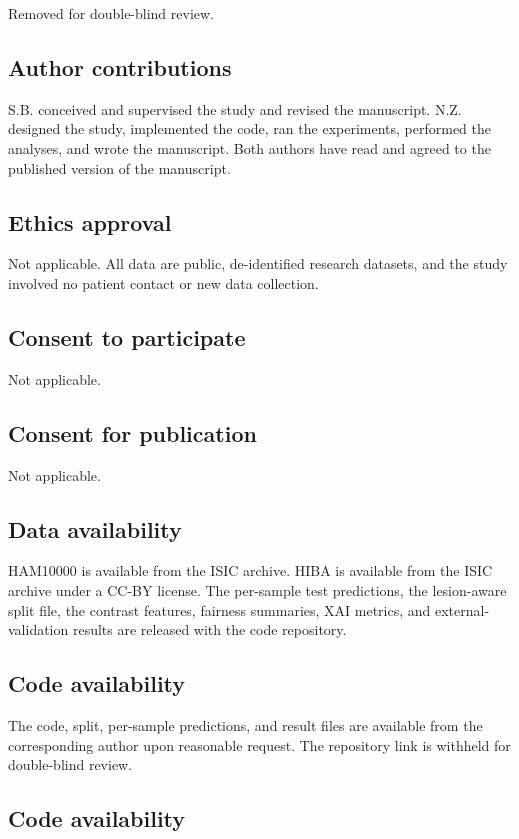 Removed for double-blind review.
\else
\subsection*{Author contributions}

S.B. conceived and supervised the study and revised the manuscript. N.Z. designed the study, implemented the code, ran the experiments, performed the analyses, and wrote the manuscript. Both authors have read and agreed to the published version of the manuscript.
\fi

\subsection*{Ethics approval}

Not applicable. All data are public, de-identified research datasets, and the study involved no patient contact or new data collection.

\subsection*{Consent to participate}

Not applicable.

\subsection*{Consent for publication}

Not applicable.

\subsection*{Data availability}

HAM10000 is available from the ISIC archive. HIBA is available from the ISIC archive under a CC-BY license. The per-sample test predictions, the lesion-aware split file, the contrast features, fairness summaries, XAI metrics, and external-validation results are released with the code repository.

\ifdefined\blindmode
\subsection*{Code availability}

The code, split, per-sample predictions, and result files are available from the corresponding author upon reasonable request. The repository link is withheld for double-blind review.
\else
\subsection*{Code availability}


